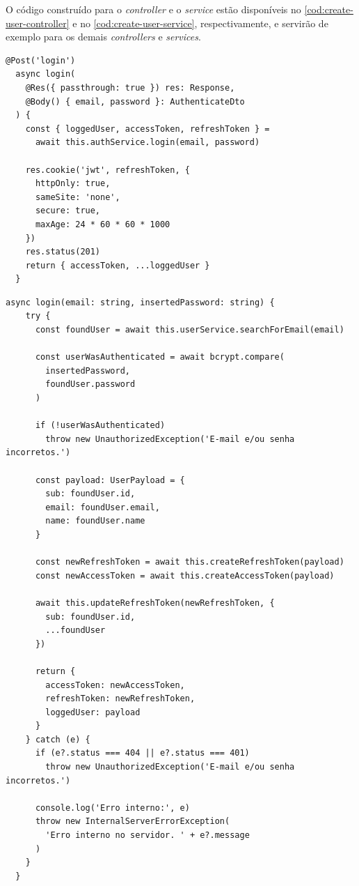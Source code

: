 O código construído para o \textit{controller} e  o \textit{service} estão disponíveis no \autoref{cod:create-user-controller} e  no \autoref{cod:create-user-service}, respectivamente, e servirão de exemplo para os demais \textit{controllers} e \textit{services}.

\begin{lstlisting}[caption={Exemplo de \textit{controller} para \textit{login}.},label={cod:login-controller}]
	@Post('login')
  async login(
    @Res({ passthrough: true }) res: Response,
    @Body() { email, password }: AuthenticateDto
  ) {
    const { loggedUser, accessToken, refreshToken } =
      await this.authService.login(email, password)

    res.cookie('jwt', refreshToken, {
      httpOnly: true,
      sameSite: 'none',
      secure: true,
      maxAge: 24 * 60 * 60 * 1000
    })
    res.status(201)
    return { accessToken, ...loggedUser }
  }
\end{lstlisting}

\begin{lstlisting}[caption={Exemplo de \textit{service} para \textit{login}.},label={cod:login-service}]
	async login(email: string, insertedPassword: string) {
    try {
      const foundUser = await this.userService.searchForEmail(email)

      const userWasAuthenticated = await bcrypt.compare(
        insertedPassword,
        foundUser.password
      )

      if (!userWasAuthenticated)
        throw new UnauthorizedException('E-mail e/ou senha incorretos.')

      const payload: UserPayload = {
        sub: foundUser.id,
        email: foundUser.email,
        name: foundUser.name
      }

      const newRefreshToken = await this.createRefreshToken(payload)
      const newAccessToken = await this.createAccessToken(payload)

      await this.updateRefreshToken(newRefreshToken, {
        sub: foundUser.id,
        ...foundUser
      })

      return {
        accessToken: newAccessToken,
        refreshToken: newRefreshToken,
        loggedUser: payload
      }
    } catch (e) {
      if (e?.status === 404 || e?.status === 401)
        throw new UnauthorizedException('E-mail e/ou senha incorretos.')

      console.log('Erro interno:', e)
      throw new InternalServerErrorException(
        'Erro interno no servidor. ' + e?.message
      )
    }
  }
\end{lstlisting}

